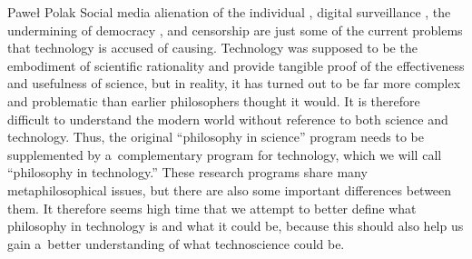 \begin{artengenv}{Paweł Polak}
Social media alienation of the individual 
\parencite[][]{reveley_understanding_2013}, %
 digital surveillance 
\parencites[][]{galic_bentham_2017}[][]{selinger_normalizing_2021}, %
 the undermining of democracy 
\parencite[][]{olaniran_social_2020}, %
 and censorship 
\parencite[][]{cobbe_algorithmic_2021} %
 are just some of the current problems that technology is accused of causing. Technology was supposed to be the embodiment of scientific rationality and provide tangible proof of the effectiveness and usefulness of science, but in reality, it has turned out to be far more complex and problematic than earlier philosophers thought it would. It is therefore difficult to understand the modern world without reference to both science and technology. Thus, the original ``philosophy in science'' program needs to be supplemented by a~complementary program for technology, which we will call ``philosophy in technology.'' These research programs share many metaphilosophical issues, but there are also some important differences between them. It therefore seems high time that we attempt to better define what philosophy in technology is and what it could be, because this should also help us gain a~better understanding of what technoscience could be.




\end{artengenv}
